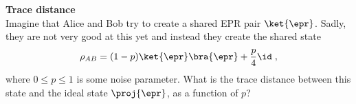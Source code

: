 \chapter{}


\begin{exercises}

\item {\bf Trace distance}\\
Imagine that Alice and Bob try to create a shared EPR pair $\ket{\epr}$. Sadly, they are not very good at this yet and instead they create the shared state
\begin{equation}
\rho_{AB} = (1-p)\ket{\epr}\bra{\epr} + \frac{p}{4} \id\;,
\end{equation}
where $0\leq p\leq 1$ is some noise parameter. What is the trace distance between this state and the ideal state $\proj{\epr}$, as a function of $p$?



\end{exercises}
